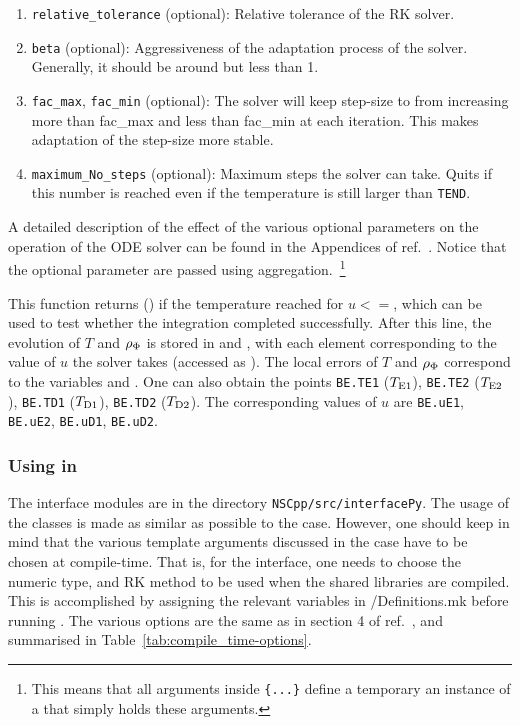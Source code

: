 \documentclass[11pt,a4paper]{article}
\begin{document}
\begin{enumerate}
	\item {\tt relative\_tolerance} (optional): Relative tolerance of the RK solver.
	
	\item {\tt beta} (optional): Aggressiveness of the adaptation process of the solver. Generally, it should be around but less than 1.
	
	\item {\tt fac\_max},  {\tt fac\_min} (optional): The solver will keep step-size to from increasing more than fac\_max and less than fac\_min at each iteration. This makes adaptation of the step-size more stable.
	
	\item {\tt maximum\_No\_steps} (optional): Maximum steps the solver can take. Quits if this number is reached even if the temperature is still larger than {\tt TEND}. 
\end{enumerate}
%
A detailed description of the  effect of the various optional parameters on the operation of the ODE solver can be found in the Appendices of ref.~\cite{Karamitros:2021nxi}. Notice that the optional parameter are passed using aggregation.~\footnote{This means that all arguments inside {\tt \{...\}} define a temporary an instance of a  that simply holds these arguments.} 


This function returns  () if the temperature reached  for $u<=$, which can be used to test whether the integration completed successfully.
%
After this line, the evolution of $T$ and $\rho_{\Phi}$ is stored in  and , with each element corresponding to the value of $u$ the solver takes (accessed as ). The local errors of $T$ and $\rho_{\Phi}$ correspond to the variables  and . 
%
One can also obtain the points {\tt BE.TE1} ($T_{\rm E1}{}$), {\tt BE.TE2} ($T_{\rm E2}{}$), {\tt BE.TD1} ($T_{\rm D1}{}$), {\tt BE.TD2} ($T_{\rm D2}{}$). The corresponding values of $u$ are {\tt BE.uE1}, {\tt BE.uE2}, {\tt BE.uD1}, {\tt BE.uD2}.

\subsubsection{Using \nsc in \PY}\label{sec:begin_py}
%
The \PY interface modules are in the directory {\tt NSCpp/src/interfacePy}. The usage of the classes is made as similar as possible to the \CPP case. However, one should keep in mind that the various template arguments discussed in the \CPP case have to be chosen at compile-time. That is, for the \PY interface, one needs to choose the numeric type, and RK method to be used when the shared libraries are compiled. This is accomplished by assigning the relevant variables in {\nsc/Definitions.mk} before running . The various options are the same as in section 4 of ref.~\cite{Karamitros:2021nxi}, and summarised in Table~\ref{tab:compile_time-options}.
\end{document}
